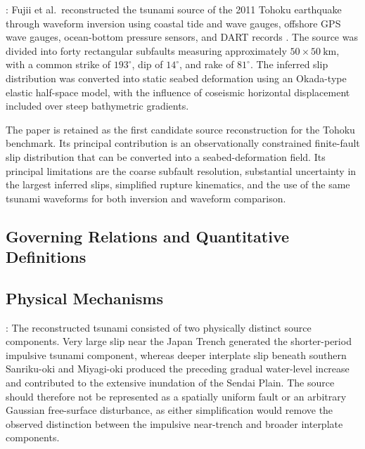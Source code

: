 \textcite{fujii2011tsunamisource}: Fujii et al.\ reconstructed the tsunami source of the 2011 Tohoku earthquake through waveform inversion using coastal tide and wave gauges, offshore GPS wave gauges, ocean-bottom pressure sensors, and DART records \cite{fujii2011tsunamisource}. The source was divided into forty rectangular subfaults measuring approximately $50 \times 50~\mathrm{km}$, with a common strike of $193^\circ$, dip of $14^\circ$, and rake of $81^\circ$. The inferred slip distribution was converted into static seabed deformation using an Okada-type elastic half-space model, with the influence of coseismic horizontal displacement included over steep bathymetric gradients.

The paper is retained as the first candidate source reconstruction for the Tohoku benchmark. Its principal contribution is an observationally constrained finite-fault slip distribution that can be converted into a seabed-deformation field. Its principal limitations are the coarse subfault resolution, substantial uncertainty in the largest inferred slips, simplified rupture kinematics, and the use of the same tsunami waveforms for both inversion and waveform comparison.

\subsection{Governing Relations and Quantitative Definitions}
\label{sec:res-phy-src-governing-relations}

%

\subsection{Physical Mechanisms}
\label{sec:res-phy-src-physical-mechanisms}


\textcite{fujii2011tsunamisource}: The reconstructed tsunami consisted of two physically distinct source components. Very large slip near the Japan Trench generated the shorter-period impulsive tsunami component, whereas deeper interplate slip beneath southern Sanriku-oki and Miyagi-oki produced the preceding gradual water-level increase and contributed to the extensive inundation of the Sendai Plain. The source should therefore not be represented as a spatially uniform fault or an arbitrary Gaussian free-surface disturbance, as either simplification would remove the observed distinction between the impulsive near-trench and broader interplate components.

